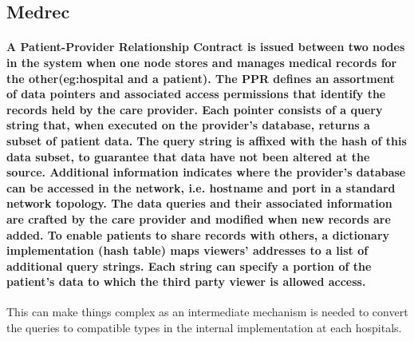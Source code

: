 \documentclass[12pt]{report}
\begin{document}
\subsection{Medrec}
\paragraph{A Patient-Provider Relationship Contract is issued between two nodes in the system when one node stores and manages medical records for the other(eg:hospital and a patient). The PPR defines an assortment of data
pointers and associated access permissions that identify the records held by the care provider. Each pointer
consists of a query string that, when executed on the provider's database, returns a subset of patient data.
The query string is affixed with the hash of this data subset, to guarantee that data have not been altered
at the source. Additional information indicates where the provider's database can be accessed in the
network, i.e. hostname and port in a standard network topology. The data queries and their associated
information are crafted by the care provider and modified when new records are added. To enable patients
to share records with others, a dictionary implementation (hash table) maps viewers’ addresses to a list of
additional query strings. Each string can specify a portion of the patient's data to which the third party
viewer is allowed access.}
\par This can make things complex as an intermediate mechanism is needed to convert the queries to compatible types in the internal implementation at each hospitals.
\end{document}
